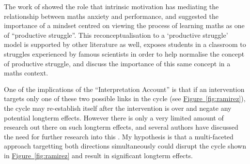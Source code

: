 \documentclass[twoside,12pt,a4paper]{report}
\newcommand{\reffig}[1]{\hyperref[fig:#1]{Figure~\ref{fig:#1}}}
\begin{document}
The work of  showed the role that intrinsic motivation has mediating the relationship between maths anxiety and performance, and suggested the importance of a mindset centred on viewing the process of learning maths as one of ``productive struggle''. This reconceptualisation to a `productive struggle' model is supported by other literature as well,  exposes students in a classroom to struggles experienced by famous scientists in order to help normalise the concept of productive struggle, and  discuss the importance of this same concept in a maths context.

One of the implications of the ``Interpretation Account'' is that if an intervention targets only one of these two possible links in the cycle (see \reffig{ramirez}), the cycle may re-establish itself after the intervention is over and negate any potential longterm effects. However there is only a very limited amount of research out there on such longterm effects, and several authors have discussed the need for further research into this \cite{Pellicioni2016,Chang2016}. My hypothesis is that a multi-faceted approach targetting both directions simultaneously could disrupt the cycle shown in \reffig{ramirez} and result in significant longterm effects.

%
\end{document}
